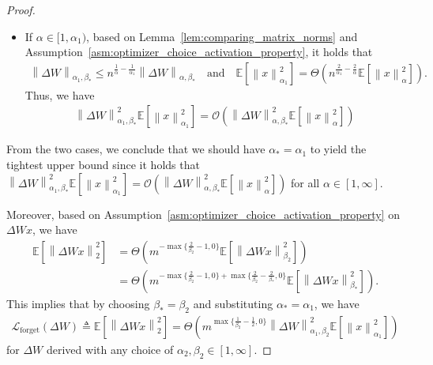 \documentclass{article}
\theoremstyle{remark}
\newcommand{\Norm}[1]{\left\|#1\right\|}
\newcommand{\EE}{\mathbb{E}}
\newcommand{\cO}{\mathcal{O}}
\newcommand{\Lforget}{\mathcal{L}_{\mathrm{forget}}}
\begin{document}
\begin{proof}
\begin{itemize}
        \item If $\alpha \in [1,\alpha_1)$, based on Lemma~\ref{lem:comparing_matrix_norms} and Assumption~\ref{asm:optimizer_choice_activation_property}, it holds that
        \begin{align*}
            \Norm{\Delta W}_{\alpha_1,\beta_*} \le n^{\frac{1}{\alpha} - \frac{1}{\alpha_1}} \Norm{\Delta W}_{\alpha,\beta_*} \quad \mathrm{and} \quad \EE\left[ \Norm{x}_{\alpha_1}^2 \right] = \Theta\left( n^{\frac{2}{\alpha_1} - \frac{2}{\alpha}} \EE\left[ \Norm{x}_{\alpha}^2 \right] \right).
        \end{align*}
        Thus, we have
        \begin{align*}
            \Norm{\Delta W}_{\alpha_1,\beta_*}^2 \EE\left[ \Norm{x}_{\alpha_1}^2 \right] = \cO\left( \Norm{\Delta W}_{\alpha,\beta_*}^2 \EE\left[ \Norm{x}_{\alpha}^2 \right] \right)
        \end{align*}
    \end{itemize}
    From the two cases, we conclude that we should have $\alpha_*=\alpha_1$ to yield the tightest upper bound since it holds that $\Norm{\Delta W}_{\alpha_1,\beta_*}^2 \EE\left[ \Norm{x}_{\alpha_1}^2 \right] = \cO\left( \Norm{\Delta W}_{\alpha,\beta_*}^2 \EE\left[ \Norm{x}_{\alpha}^2 \right] \right)$ for all $\alpha \in [1,\infty]$.

    
    Moreover, based on Assumption~\ref{asm:optimizer_choice_activation_property} on $\Delta W x$, we have
    \begin{align*}
        \EE\left[ \Norm{\Delta W x}_{2}^2 \right] 
        &= \Theta \left( m^{-\max\{ \frac{2}{\beta_2} - 1,0 \} } \EE\left[ \Norm{\Delta W x}_{\beta_2}^2 \right] \right) \\
        &= \Theta \left( m^{-\max\{ \frac{2}{\beta_2} - 1,0 \} + \max\{ \frac{2}{\beta_2} - \frac{2}{\beta_*},0 \} } \EE\left[ \Norm{\Delta W x}_{\beta_*}^2 \right] \right) .
    \end{align*}
    This implies that by choosing $\beta_* = \beta_2$ and substituting $\alpha_* = \alpha_1$, we have
    \begin{align}\label{eq:proof_thm_lforget_equivalent}
        \Lforget(\Delta W) \triangleq \EE\left[ \Norm{\Delta W x}_{2}^2 \right] = \Theta \left( m^{\max\{ \frac{1}{\beta_2} - \frac{1}{2},0 \} }  \Norm{\Delta W}_{\alpha_1,\beta_2}^2 \EE\left[ \Norm{x}_{\alpha_1}^2 \right] \right) 
    \end{align}
    for $\Delta W$ derived with any choice of $\alpha_2,\beta_2 \in [1,\infty]$. 


\end{proof}
\end{document}
